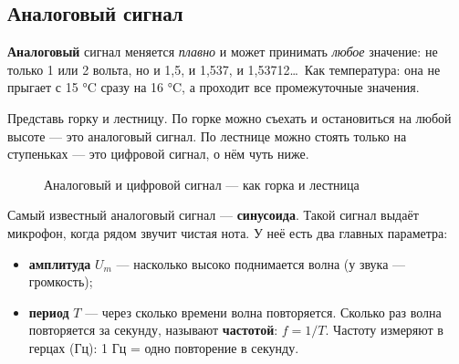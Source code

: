 \subsection*{Аналоговый сигнал}

\textbf{Аналоговый} сигнал меняется \emph{плавно} и может принимать \emph{любое} значение: не только
1 или 2 вольта, но и 1,5, и 1,537, и 1,53712\ldots\ Как температура: она не прыгает с 15 °C сразу
на 16 °C, а проходит все промежуточные значения.

Представь горку и лестницу. По горке можно съехать и остановиться на любой высоте --- это аналоговый
сигнал. По лестнице можно стоять только на ступеньках --- это цифровой сигнал, о нём чуть ниже.

\begin{figure}[H]
\centering
{}
\caption{Аналоговый и цифровой сигнал --- как горка и лестница}
\end{figure}

Самый известный аналоговый сигнал --- \textbf{синусоида}. Такой сигнал выдаёт микрофон, когда
рядом звучит чистая нота. У неё есть два главных параметра:
\begin{itemize}
  \item \textbf{амплитуда} $U_m$ --- насколько высоко поднимается волна (у звука --- громкость);
  \item \textbf{период} $T$ --- через сколько времени волна повторяется. Сколько раз волна повторяется за
        секунду, называют \textbf{частотой}: $f = 1/T$. Частоту измеряют в герцах (Гц): 1 Гц = одно повторение в секунду.
\end{itemize}

